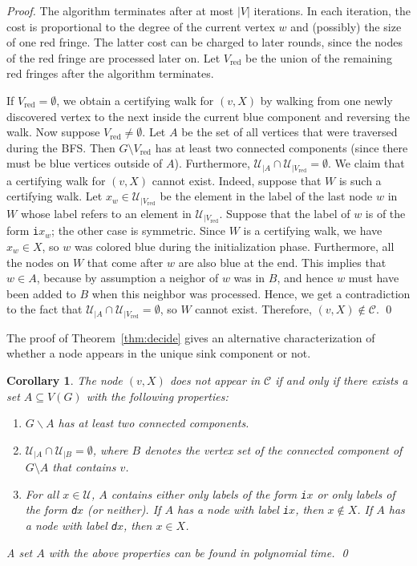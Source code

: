 \documentclass[oribibl,envcountsect,envcountsame]{llncs}
\newtheorem{corol}[theorem]{Corollary}
\newcommand{\Vred}{V_\text{red}}
\newcommand{\C}{\mathcal C}
\newcommand{\U}{\mathcal U}
\begin{document}
\begin{proof}
The algorithm terminates after at
most $|V|$ iterations. In each iteration, the cost is proportional 
to the degree of the current vertex $w$ and (possibly) the size of 
one red fringe. The latter
cost can be charged to later rounds, since the nodes of the red fringe 
are processed later on. Let $\Vred$ be the union of the
remaining red fringes after the algorithm terminates.

If $\Vred = \emptyset$, 
we obtain a certifying walk for $(v, X)$ 
by walking from one newly discovered vertex to the next inside the current
blue component and reversing the walk. Now suppose $\Vred \neq \emptyset$. 
Let $A$ be the set of all vertices that were traversed during the BFS. Then
$G \setminus \Vred$ has  at least two connected
components (since there must be blue vertices outside of $A$). Furthermore, 
$\U_{|A} \cap \U_{|\Vred} = \emptyset$.
We claim that a certifying walk for $(v, X)$ cannot exist. Indeed, suppose
that $W$ is such a certifying walk. Let $x_w \in \U_{|\Vred}$ be the element
in the label of the last node $w$ in $W$ whose label refers 
to an element in $\U_{|\Vred}$. Suppose that the label of $w$ is of the form
\texttt{i}$x_w$; the other case is symmetric. Since $W$ is a
certifying walk, we have $x_w \in X$, so $w$ was colored blue during the
initialization phase. Furthermore,
all the nodes on $W$ that come after $w$ are also blue at the end. 
This implies that 
$w \in A$, because by assumption a neighor of $w$ was in $B$, and hence
$w$ must have been added to $B$ when this neighbor was processed. 
Hence, we get a contradiction to the fact that 
$\U_{|A} \cap \U_{|\Vred} = \emptyset$, so
$W$ cannot exist. Therefore, $(v,X) \not\in \C$.
\qed\end{proof}

The proof of Theorem~\ref{thm:decide} gives an alternative characterization of
whether a node appears in the unique sink component or not.
\begin{corol}
The node $(v, X)$ does not appear in $\C$ if and only if 
there exists a set $A \subseteq V(G)$ with the following properties: 
\begin{enumerate}
\item $G \backslash A$ has at least two connected components.
\item $\U_{|A} \cap \U_{|B} = \emptyset$, where $B$ denotes the
vertex set of the connected component
of $G \setminus A$ that contains $v$.
\item For all $x \in \U$, $A$ contains either only labels of the form 
\texttt{i}$x$ or only labels of the form \texttt{d}$x$ (or neither). 
If $A$ has a node with label \texttt{i}$x$, then $x \not\in X$.
If $A$ has a node with label \texttt{d}$x$, 
then $x \in X$.
\end{enumerate}
A set $A$ with the above properties can be found in polynomial time.
\qed
\end{corol}
\end{document}
